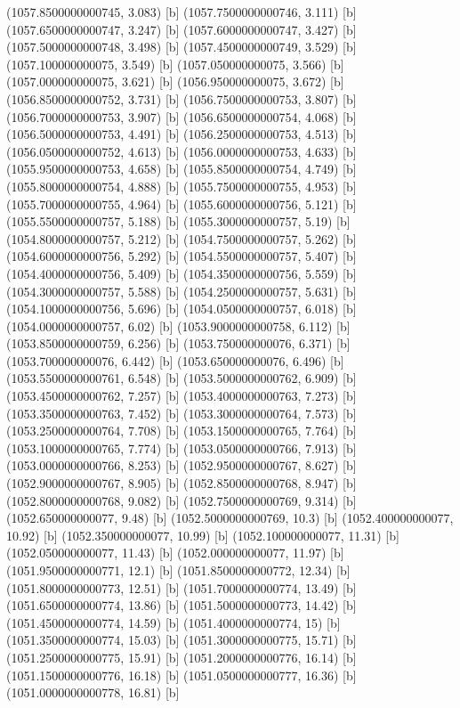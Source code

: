 {{{(1057.8500000000745, 3.083) [b] 
(1057.7500000000746, 3.111) [b] 
(1057.6500000000747, 3.247) [b] 
(1057.6000000000747, 3.427) [b] 
(1057.5000000000748, 3.498) [b] 
(1057.4500000000749, 3.529) [b] 
(1057.100000000075, 3.549) [b] 
(1057.050000000075, 3.566) [b] 
(1057.000000000075, 3.621) [b] 
(1056.950000000075, 3.672) [b] 
(1056.8500000000752, 3.731) [b] 
(1056.7500000000753, 3.807) [b] 
(1056.7000000000753, 3.907) [b] 
(1056.6500000000754, 4.068) [b] 
(1056.5000000000753, 4.491) [b] 
(1056.2500000000753, 4.513) [b] 
(1056.0500000000752, 4.613) [b] 
(1056.0000000000753, 4.633) [b] 
(1055.9500000000753, 4.658) [b] 
(1055.8500000000754, 4.749) [b] 
(1055.8000000000754, 4.888) [b] 
(1055.7500000000755, 4.953) [b] 
(1055.7000000000755, 4.964) [b] 
(1055.6000000000756, 5.121) [b] 
(1055.5500000000757, 5.188) [b] 
(1055.3000000000757, 5.19) [b] 
(1054.8000000000757, 5.212) [b] 
(1054.7500000000757, 5.262) [b] 
(1054.6000000000756, 5.292) [b] 
(1054.5500000000757, 5.407) [b] 
(1054.4000000000756, 5.409) [b] 
(1054.3500000000756, 5.559) [b] 
(1054.3000000000757, 5.588) [b] 
(1054.2500000000757, 5.631) [b] 
(1054.1000000000756, 5.696) [b] 
(1054.0500000000757, 6.018) [b] 
(1054.0000000000757, 6.02) [b] 
(1053.9000000000758, 6.112) [b] 
(1053.8500000000759, 6.256) [b] 
(1053.750000000076, 6.371) [b] 
(1053.700000000076, 6.442) [b] 
(1053.650000000076, 6.496) [b] 
(1053.5500000000761, 6.548) [b] 
(1053.5000000000762, 6.909) [b] 
(1053.4500000000762, 7.257) [b] 
(1053.4000000000763, 7.273) [b] 
(1053.3500000000763, 7.452) [b] 
(1053.3000000000764, 7.573) [b] 
(1053.2500000000764, 7.708) [b] 
(1053.1500000000765, 7.764) [b] 
(1053.1000000000765, 7.774) [b] 
(1053.0500000000766, 7.913) [b] 
(1053.0000000000766, 8.253) [b] 
(1052.9500000000767, 8.627) [b] 
(1052.9000000000767, 8.905) [b] 
(1052.8500000000768, 8.947) [b] 
(1052.8000000000768, 9.082) [b] 
(1052.7500000000769, 9.314) [b] 
(1052.650000000077, 9.48) [b] 
(1052.5000000000769, 10.3) [b] 
(1052.400000000077, 10.92) [b] 
(1052.350000000077, 10.99) [b] 
(1052.100000000077, 11.31) [b] 
(1052.050000000077, 11.43) [b] 
(1052.000000000077, 11.97) [b] 
(1051.9500000000771, 12.1) [b] 
(1051.8500000000772, 12.34) [b] 
(1051.8000000000773, 12.51) [b] 
(1051.7000000000774, 13.49) [b] 
(1051.6500000000774, 13.86) [b] 
(1051.5000000000773, 14.42) [b] 
(1051.4500000000774, 14.59) [b] 
(1051.4000000000774, 15) [b] 
(1051.3500000000774, 15.03) [b] 
(1051.3000000000775, 15.71) [b] 
(1051.2500000000775, 15.91) [b] 
(1051.2000000000776, 16.14) [b] 
(1051.1500000000776, 16.18) [b] 
(1051.0500000000777, 16.36) [b] 
(1051.0000000000778, 16.81) [b] 
}}}

